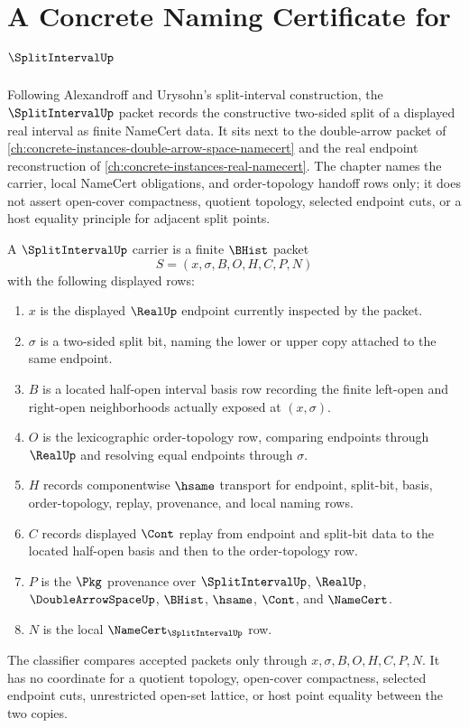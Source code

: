 \chapter{A Concrete Naming Certificate for $\SplitIntervalUp$}
\label{ch:concrete-instances-split-interval-namecert}

Following Alexandroff and Urysohn's split-interval construction, the $\SplitIntervalUp$ packet records the constructive two-sided split of a displayed real interval as finite NameCert data. It sits next to the double-arrow packet of \autoref{ch:concrete-instances-double-arrow-space-namecert} and the real endpoint reconstruction of \autoref{ch:concrete-instances-real-namecert}. The chapter names the carrier, local NameCert obligations, and order-topology handoff rows only; it does not assert open-cover compactness, quotient topology, selected endpoint cuts, or a host equality principle for adjacent split points.

\begin{definition}
\label{def:split-interval-carrier}
A $\SplitIntervalUp$ carrier is a finite $\BHist$ packet
$$
S=(x,\sigma,B,O,H,C,P,N)
$$
with the following displayed rows:
\begin{enumerate}
\item $x$ is the displayed $\RealUp$ endpoint currently inspected by the packet.
\item $\sigma$ is a two-sided split bit, naming the lower or upper copy attached to the same endpoint.
\item $B$ is a located half-open interval basis row recording the finite left-open and right-open neighborhoods actually exposed at $(x,\sigma)$.
\item $O$ is the lexicographic order-topology row, comparing endpoints through $\RealUp$ and resolving equal endpoints through $\sigma$.
\item $H$ records componentwise $\hsame$ transport for endpoint, split-bit, basis, order-topology, replay, provenance, and local naming rows.
\item $C$ records displayed $\Cont$ replay from endpoint and split-bit data to the located half-open basis and then to the order-topology row.
\item $P$ is the $\Pkg$ provenance over $\SplitIntervalUp$, $\RealUp$, $\DoubleArrowSpaceUp$, $\BHist$, $\hsame$, $\Cont$, and $\NameCert$.
\item $N$ is the local $\NameCert_{\SplitIntervalUp}$ row.
\end{enumerate}
The classifier compares accepted packets only through $x,\sigma,B,O,H,C,P,N$. It has no coordinate for a quotient topology, open-cover compactness, selected endpoint cuts, unrestricted open-set lattice, or host point equality between the two copies.
\end{definition}

